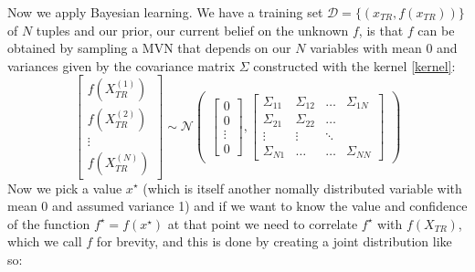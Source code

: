 \documentclass{article}
\begin{document}
Now we apply Bayesian learning. We have a training set $\mathcal{D} = \{(x_{TR}, f(x_{TR}))\}$ of $N$ tuples and our prior, our current belief on the unknown $f$, is that $f$ can be obtained by sampling a MVN that depends on our $N$ variables with mean 0 and variances given by the covariance matrix $\Sigma$ constructed with the kernel \eqref{kernel}:
\begin{equation}
    \begin{bmatrix}
    f(X_{TR}^{(1)}) \\
    f(X_{TR}^{(2)}) \\
    \vdots \\
    f(X_{TR}^{(N)})
    \end{bmatrix}
    \sim
    \mathcal{N}
    \begin{pmatrix}
    \begin{bmatrix}
    0 \\
    0 \\
    \vdots \\
    0
    \end{bmatrix}
    ,
    \begin{bmatrix}
    \Sigma_{11} & \Sigma_{12} & \dots & \Sigma_{1N} \\
    \Sigma_{21} & \Sigma_{22} & \dots  \\
    \vdots & \vdots{} & \ddots \\
    \Sigma_{N1} & \dots & \dots & \Sigma_{NN}
    \end{bmatrix}
    \end{pmatrix}
\end{equation}
Now we pick a value $x^\star$ (which is itself another nomally distributed variable with mean 0 and assumed variance 1) and if we want to know the value and confidence of the function $f^\star = f(x^\star)$ at that point we need to correlate $f^\star$ with $f(X_{TR})$, which we call $f$ for brevity, and this is done by creating a joint distribution like so:
\end{document}
